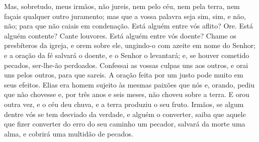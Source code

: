 Mas, sobretudo, meus irmãos, não jureis, nem pelo céu, nem pela
terra, nem façais qualquer outro juramento; mas que a vossa palavra
seja sim, sim, e não, não; para que não caiais em condenação.
Está alguém entre vós aflito? Ore. Está alguém contente?
Cante louvores. Está alguém entre vós doente? Chame os
presbíteros da igreja, e orem sobre ele, ungindo-o com azeite em
nome do Senhor; e a oração da fé salvará o doente, e o Senhor
o levantará; e, se houver cometido pecados, ser-lhe-ão perdoados.
Confessai as vossas culpas uns aos outros, e orai uns pelos
outros, para que sareis. A oração feita por um justo pode muito em
seus efeitos. Elias era homem sujeito às mesmas paixões que
nós e, orando, pediu que não chovesse e, por três anos e seis meses,
não choveu sobre a terra. E orou outra vez, e o céu deu
chuva, e a terra produziu o seu fruto. Irmãos, se algum
dentre vós se tem desviado da verdade, e alguém o converter,
saiba que aquele que fizer converter do erro do seu caminho
um pecador, salvará da morte uma alma, e cobrirá uma multidão de
pecados.

